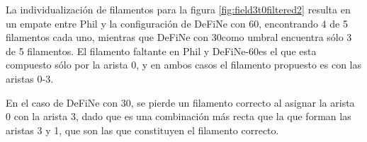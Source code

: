 
La individualizaci\'on de filamentos para la figura \ref{fig:field3t0filtered2} resulta en un empate entre Phil y la configuraci\'on de DeFiNe con 60\textdegree, encontrando 4 de 5 filamentos cada uno, mientras que DeFiNe con 30\textdegree como umbral encuentra s\'olo 3 de 5 filamentos. El filamento faltante en Phil y DeFiNe-60\textdegree es el que esta compuesto s\'olo por la arista 0, y en ambos casos el filamento propuesto es con las aristas 0-3.


En el caso de DeFiNe con 30\textdegree, se pierde un filamento correcto al asignar la arista 0 con la arista 3, dado que es una combinaci\'on m\'as recta que la que forman las aristas 3 y 1, que son las que constituyen el filamento correcto.

